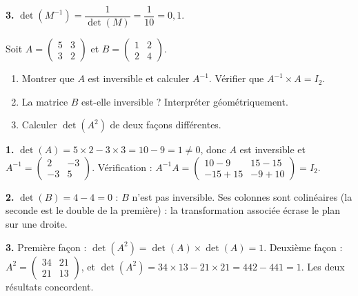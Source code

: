 \documentclass[11pt]{article}
\begin{document}
\begin{exoresolu}
\textbf{3.} $\det(M^{-1}) = \dfrac{1}{\det(M)} = \dfrac{1}{10} = 0{,}1$.
\end{exoresolu}

\begin{exercice}
Soit $A = \begin{pmatrix} 5 & 3 \\ 3 & 2 \end{pmatrix}$ et $B = \begin{pmatrix} 1 & 2 \\ 2 & 4 \end{pmatrix}$.
\begin{enumerate}
\item Montrer que $A$ est inversible et calculer $A^{-1}$. Vérifier que $A^{-1} \times A = I_2$.
\item La matrice $B$ est-elle inversible ? Interpréter géométriquement.
\item Calculer $\det(A^2)$ de deux façons différentes.
\end{enumerate}
\end{exercice}

\begin{corrige}[Exercice]
\textbf{1.} $\det(A) = 5\times 2 - 3\times 3 = 10 - 9 = 1 \neq 0$, donc $A$ est inversible et $A^{-1} = \begin{pmatrix} 2 & -3 \\ -3 & 5 \end{pmatrix}$. Vérification : $A^{-1}A = \begin{pmatrix} 10-9 & 15-15 \\ -15+15 & -9+10 \end{pmatrix} = I_2$.

\textbf{2.} $\det(B) = 4 - 4 = 0$ : $B$ n'est pas inversible. Ses colonnes sont colinéaires (la seconde est le double de la première) : la transformation associée écrase le plan sur une droite.

\textbf{3.} Première façon : $\det(A^2) = \det(A)\times\det(A) = 1$. Deuxième façon : $A^2 = \begin{pmatrix} 34 & 21 \\ 21 & 13 \end{pmatrix}$, et $\det(A^2) = 34\times 13 - 21\times 21 = 442 - 441 = 1$. Les deux résultats concordent.
\end{corrige}
\end{document}
